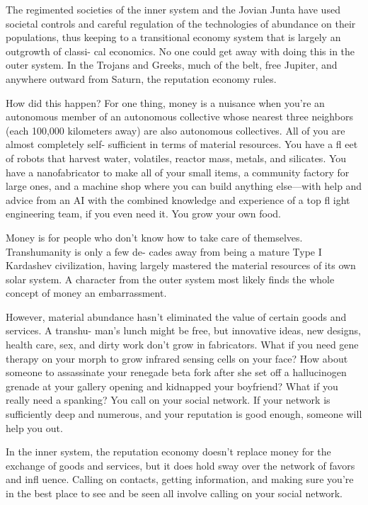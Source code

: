 The regimented societies of the inner system and the Jovian 
Junta have used societal controls and careful regulation of the 
technologies of abundance on their populations, thus keeping to a 
transitional economy system that is largely an outgrowth of classi-
cal economics. No one could get away with doing this in the outer 
system. In the Trojans and Greeks, much of the belt, free Jupiter, and 
anywhere outward from Saturn, the reputation economy rules.

How did this happen? For one thing, money is a nuisance when 
you're an autonomous member of an autonomous collective whose 
nearest three neighbors (each 100,000 kilometers away) are also 
autonomous collectives. All of you are almost completely self-
sufficient in terms of material resources. You have a fl eet of robots 
that harvest water, volatiles, reactor mass, metals, and silicates. You 
have a nanofabricator to make all of your small items, a community 
factory for large ones, and a machine shop where you can build 
anything else—with help and advice from an AI with the combined 
knowledge and experience of a top fl ight engineering team, if you 
even need it. You grow your own food.

Money is for people who don't know how to take 
care of themselves. Transhumanity is only a few de-
cades away from being a mature Type I Kardashev 
civilization, having largely mastered the material 
resources of its own solar system. A character from 
the outer system most likely finds the whole concept 
of money an embarrassment.

However, material abundance hasn't eliminated 
the value of certain goods and services. A transhu-
man's lunch might be free, but innovative ideas, new 
designs, health care, sex, and dirty work don't grow 
in fabricators. What if you need gene therapy on your 
morph to grow infrared sensing cells on your face? 
How about someone to assassinate your renegade 
beta fork after she set off a hallucinogen grenade at 
your gallery opening and kidnapped your boyfriend? 
What if you really need a spanking? You call on your 
social network. If your network is sufficiently deep 
and numerous, and your reputation is good enough, 
someone will help you out.

In the inner system, the reputation economy doesn't 
replace money for the exchange of goods and services, 
but it does hold sway over the network of favors and 
infl uence. Calling on contacts, getting information, 
and making sure you're in the best place to see and be 
seen all involve calling on your social network.


